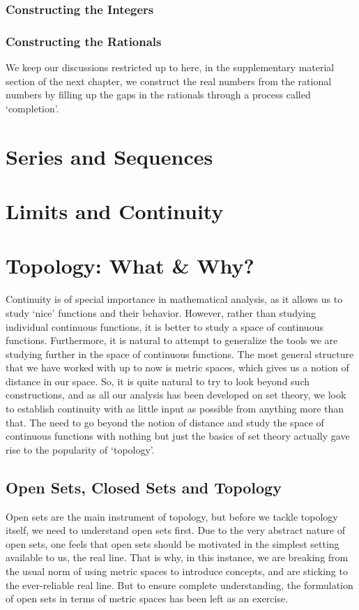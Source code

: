 \subsection{Constructing the Integers}
\subsection{Constructing the Rationals}
We keep our discussions restricted up to here, in the supplementary material section of the next chapter, we construct the real numbers from the rational numbers by filling up the gaps in the rationals through a process called `completion'.
\chapter{Series and Sequences}
\chapter{Limits and Continuity}
\chapter{Topology: What \& Why?}
Continuity is of special importance in mathematical analysis, as it allows us to study `nice' functions and their behavior. However, rather than studying individual continuous functions, it is better to study a space of continuous functions. Furthermore, it is natural to attempt to generalize the tools we are studying further in the space of continuous functions. The most general structure that we have worked with up to now is metric spaces, which gives us a notion of distance in our space. So, it is quite natural to try to look beyond such constructions, and as all our analysis has been developed on set theory, we look to establish continuity with as little input as possible from anything more than that. The need to go beyond the notion of distance and study the space of continuous functions with nothing but just the basics of set theory actually gave rise to the popularity of `topology'.
\section{Open Sets, Closed Sets and Topology}
Open sets are the main instrument of topology, but before we tackle topology itself, we need to understand open sets first. Due to the very abstract nature of open sets, one feels that open sets should be motivated in the simplest setting available to us, the real line. That is why, in this instance, we are breaking from the usual norm of using metric spaces to introduce concepts, and are sticking to the ever-reliable real line. But to ensure complete understanding, the formulation of open sets in terms of metric spaces has been left as an exercise.
